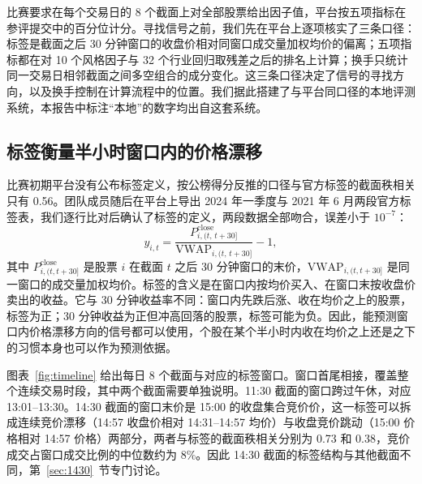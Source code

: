 \documentclass[UTF8,a4paper,zihao=-4,fontset=none]{ctexart}
\begin{document}
比赛要求在每个交易日的 8 个截面上对全部股票给出因子值，平台按五项指标在参评提交中的百分位计分。寻找信号之前，我们先在平台上逐项核实了三条口径：标签是截面之后 30 分钟窗口的收盘价相对同窗口成交量加权均价的偏离；五项指标都在对 10 个风格因子与 32 个行业回归取残差之后的排名上计算；换手只统计同一交易日相邻截面之间多空组合的成分变化。这三条口径决定了信号的寻找方向，以及换手控制在计算流程中的位置。我们据此搭建了与平台同口径的本地评测系统，本报告中标注“本地”的数字均出自这套系统。

\subsection{标签衡量半小时窗口内的价格漂移}\label{sec:label}

比赛初期平台没有公布标签定义，按公榜得分反推的口径与官方标签的截面秩相关只有 0.56。团队成员随后在平台上导出 2024 年一季度与 2021 年 6 月两段官方标签表，我们逐行比对后确认了标签的定义，两段数据全部吻合，误差小于 $10^{-7}$：
\begin{equation}
y_{i,t}=\frac{P^{\mathrm{close}}_{i,(t,\,t+30]}}{\mathrm{VWAP}_{i,(t,\,t+30]}}-1,
\end{equation}
其中 $P^{\mathrm{close}}_{i,(t,t+30]}$ 是股票 $i$ 在截面 $t$ 之后 30 分钟窗口的末价，$\mathrm{VWAP}_{i,(t,t+30]}$ 是同一窗口的成交量加权均价。标签的含义是在窗口内按均价买入、在窗口末按收盘价卖出的收益。它与 30 分钟收益率不同：窗口内先跌后涨、收在均价之上的股票，标签为正；30 分钟收益为正但冲高回落的股票，标签可能为负。因此，能预测窗口内价格漂移方向的信号都可以使用，个股在某个半小时内收在均价之上还是之下的习惯本身也可以作为预测依据。

图表~\ref{fig:timeline} 给出每日 8 个截面与对应的标签窗口。窗口首尾相接，覆盖整个连续交易时段，其中两个截面需要单独说明。11:30 截面的窗口跨过午休，对应 13:01–13:30。14:30 截面的窗口末价是 15:00 的收盘集合竞价价，这一标签可以拆成连续竞价漂移（14:57 收盘价相对 14:31–14:57 均价）与收盘竞价跳动（15:00 价格相对 14:57 价格）两部分，两者与标签的截面秩相关分别为 0.73 和 0.38，竞价成交占窗口成交比例的中位数约为 8\%。因此 14:30 截面的标签结构与其他截面不同，第~\ref{sec:1430}~节专门讨论。
\end{document}

